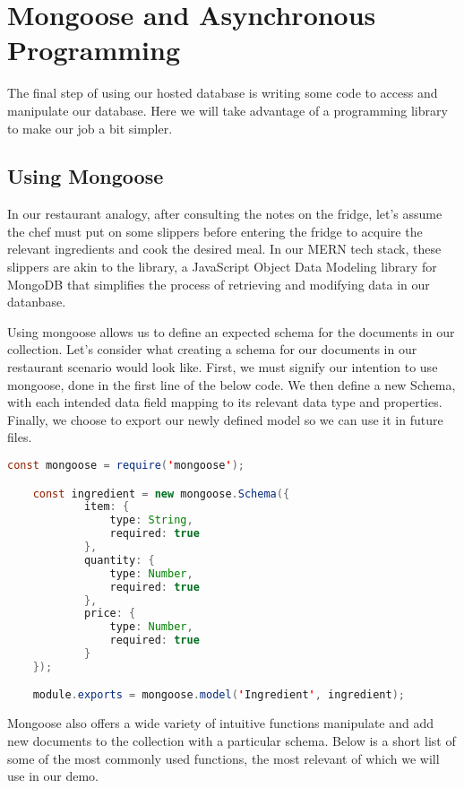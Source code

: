 \section{Mongoose and Asynchronous Programming}

The final step of using our hosted database is writing some code to access and manipulate our database. Here we will take advantage of a programming library to make our job a bit simpler. 

\subsection*{Using Mongoose}

In our restaurant analogy, after consulting the notes on the fridge, let's assume the chef must put on some slippers before entering the fridge to acquire the relevant ingredients and cook the desired meal. In our MERN tech stack, these slippers are akin to the  library, a JavaScript Object Data Modeling library for MongoDB that simplifies the process of retrieving and modifying data in our datanbase. 

Using mongoose allows us to define an expected schema for the documents in our collection. Let's consider what creating a schema for our documents in our restaurant scenario would look like. First, we must signify our intention to use mongoose, done in the first line of the below code. We then define a new Schema, with each intended data field mapping to its relevant data type and properties. Finally, we choose to export our newly defined model so we can use it in future files.

\vspace{.5cm}

\begin{lstlisting}[language=Java]
    const mongoose = require('mongoose');

    const ingredient = new mongoose.Schema({
            item: {
                type: String,
                required: true
            },
            quantity: {
                type: Number,
                required: true
            },
            price: {
                type: Number,
                required: true
            }
    });

    module.exports = mongoose.model('Ingredient', ingredient);
\end{lstlisting}

Mongoose also offers a wide variety of intuitive functions manipulate and add new documents to the collection with a particular schema. Below is a short list of some of the most commonly used functions, the most relevant of which we will use in our demo.


